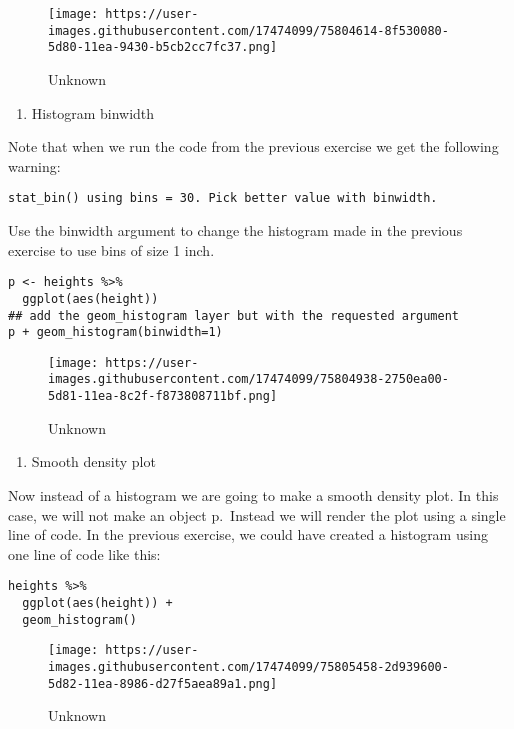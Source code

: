 \documentclass[]{article}
\providecommand{\tightlist}{%
  \setlength{\itemsep}{0pt}\setlength{\parskip}{0pt}}
\begin{document}
\begin{figure}
\centering
\texttt{[image: https://user-images.githubusercontent.com/17474099/75804614-8f530080-5d80-11ea-9430-b5cb2cc7fc37.png]}
\caption{Unknown}
\end{figure}

\begin{enumerate}
\def\labelenumi{\arabic{enumi}.}
\setcounter{enumi}{17}
\tightlist
\item
  Histogram binwidth
\end{enumerate}

Note that when we run the code from the previous exercise we get the
following warning:

\begin{verbatim}
stat_bin() using bins = 30. Pick better value with binwidth.
\end{verbatim}

Use the binwidth argument to change the histogram made in the previous
exercise to use bins of size 1 inch.

\begin{verbatim}
p <- heights %>% 
  ggplot(aes(height))
## add the geom_histogram layer but with the requested argument
p + geom_histogram(binwidth=1)
\end{verbatim}

\begin{figure}
\centering
\texttt{[image: https://user-images.githubusercontent.com/17474099/75804938-2750ea00-5d81-11ea-8c2f-f873808711bf.png]}
\caption{Unknown}
\end{figure}

\begin{enumerate}
\def\labelenumi{\arabic{enumi}.}
\setcounter{enumi}{18}
\tightlist
\item
  Smooth density plot
\end{enumerate}

Now instead of a histogram we are going to make a smooth density plot.
In this case, we will not make an object p.~Instead we will render the
plot using a single line of code. In the previous exercise, we could
have created a histogram using one line of code like this:

\begin{verbatim}
heights %>% 
  ggplot(aes(height)) +
  geom_histogram()
\end{verbatim}

\begin{figure}
\centering
\texttt{[image: https://user-images.githubusercontent.com/17474099/75805458-2d939600-5d82-11ea-8986-d27f5aea89a1.png]}
\caption{Unknown}
\end{figure}
\end{document}
